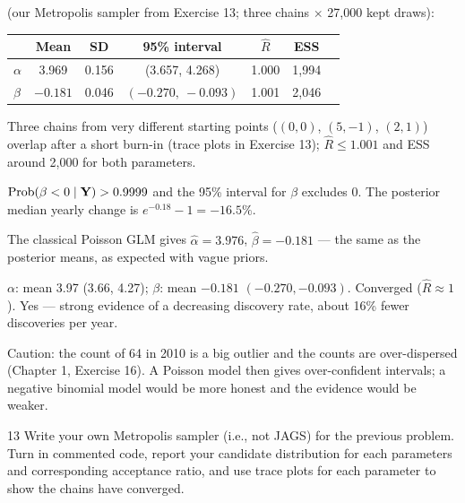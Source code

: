 \documentclass[11pt]{article}
\begin{document}
 (our Metropolis sampler from Exercise 13; three chains $\times$ 27{,}000 kept draws):
\begin{center}
\begin{tabular}{lcccccc}\toprule
 & Mean & SD & 95\% interval & $\hat R$ & ESS\\\midrule
$\alpha$ & 3.969 & 0.156 & (3.657, 4.268) & 1.000 & 1{,}994\\
$\beta$ & $-0.181$ & 0.046 & $(-0.270,\ -0.093)$ & 1.001 & 2{,}046\\\bottomrule
\end{tabular}
\end{center}
 Three chains from very different starting points ($(0,0)$, $(5,-1)$, $(2,1)$) overlap after a short burn-in (trace plots in Exercise 13); $\hat R\le1.001$ and ESS around 2{,}000 for both parameters.

$\mathrm{Prob}(\beta<0\mid\mathbf Y)>0.9999$ and the 95\% interval for $\beta$ excludes 0. The posterior median yearly change is $e^{-0.18}-1=-16.5\%$.

\begin{sanity}
The classical Poisson GLM gives $\hat\alpha=3.976$, $\hat\beta=-0.181$ --- the same as the posterior means, as expected with vague priors.
\end{sanity}

\begin{answer}
$\alpha$: mean 3.97 (3.66, 4.27); $\beta$: mean $-0.181$ $(-0.270,-0.093)$. Converged ($\hat R\approx1$). Yes --- strong evidence of a decreasing discovery rate, about 16\% fewer discoveries per year.
\end{answer}

\begin{takeaway}
Caution: the count of 64 in 2010 is a big outlier and the counts are over-dispersed (Chapter 1, Exercise 16). A Poisson model then gives over-confident intervals; a negative binomial model would be more honest and the evidence would be weaker.
\end{takeaway}


\begin{problem}{13}
Write your own Metropolis sampler (i.e., not JAGS) for the previous problem. Turn in commented code, report your candidate distribution for each parameters and corresponding acceptance ratio, and use trace plots for each parameter to show the chains have converged.
\end{problem}
\end{document}
